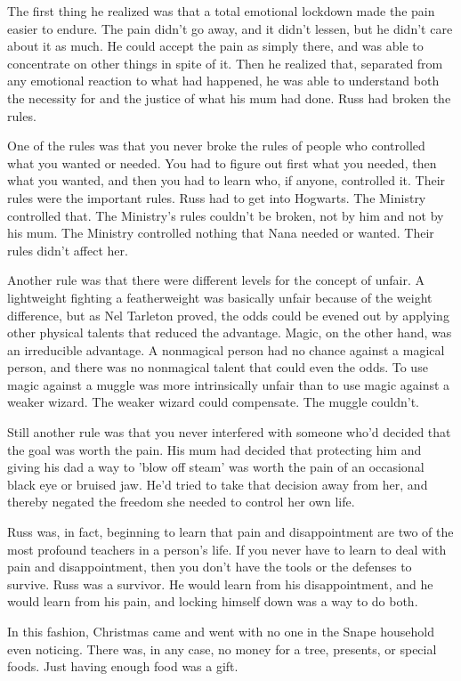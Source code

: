 \documentclass[a4paper,11pt]{article}
\begin{document}
The first thing he realized was that a total emotional lockdown made the pain easier to endure. The pain didn't go away, and it didn't lessen, but he didn't care about it as much. He could accept the pain as simply there, and was able to concentrate on other things in spite of it. Then he realized that, separated from any emotional reaction to what had happened, he was able to understand both the necessity for and the justice of what his mum had done. Russ had broken the rules.

One of the rules was that you never broke the rules of people who controlled what you wanted or needed. You had to figure out first what you needed, then what you wanted, and then you had to learn who, if anyone, controlled it. Their rules were the important rules. Russ had to get into Hogwarts. The Ministry controlled that. The Ministry's rules couldn't be broken, not by him and not by his mum. The Ministry controlled nothing that Nana needed or wanted. Their rules didn't affect her.

Another rule was that there were different levels for the concept of unfair. A lightweight fighting a featherweight was basically unfair because of the weight difference, but as Nel Tarleton proved, the odds could be evened out by applying other physical talents that reduced the advantage. Magic, on the other hand, was an irreducible advantage. A nonmagical person had no chance against a magical person, and there was no nonmagical talent that could even the odds. To use magic against a muggle was more intrinsically unfair than to use magic against a weaker wizard. The weaker wizard could compensate. The muggle couldn't.

Still another rule was that you never interfered with someone who'd decided that the goal was worth the pain. His mum had decided that protecting him and giving his dad a way to 'blow off steam' was worth the pain of an occasional black eye or bruised jaw. He'd tried to take that decision away from her, and thereby negated the freedom she needed to control her own life.

Russ was, in fact, beginning to learn that pain and disappointment are two of the most profound teachers in a person's life. If you never have to learn to deal with pain and disappointment, then you don't have the tools or the defenses to survive. Russ was a survivor. He would learn from his disappointment, and he would learn from his pain, and locking himself down was a way to do both.

In this fashion, Christmas came and went with no one in the Snape household even noticing. There was, in any case, no money for a tree, presents, or special foods. Just having enough food was a gift.
\end{document}
